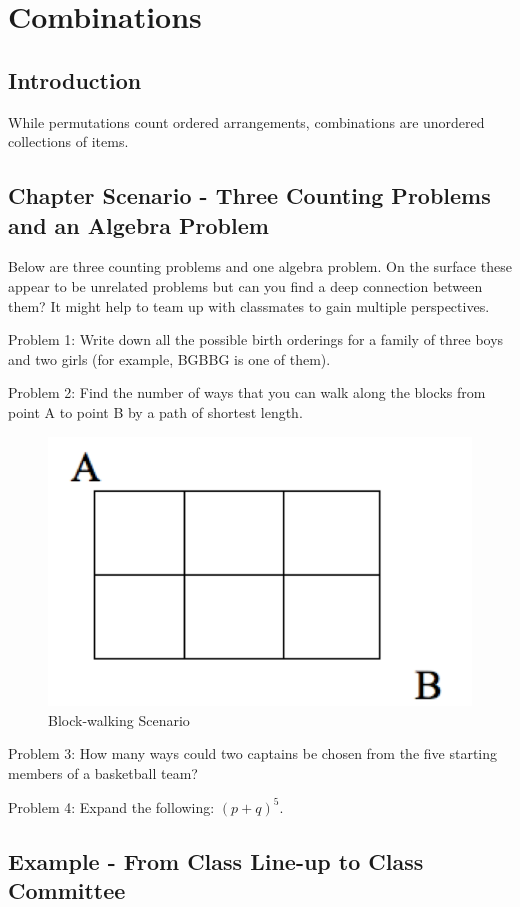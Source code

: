\documentclass[]{book}
\theoremstyle{definition}
\theoremstyle{definition}
\theoremstyle{definition}
\theoremstyle{remark}
\begin{document}
\chapter{Combinations}\label{combinations}

\section{Introduction}\label{introduction}

While permutations count ordered arrangements, combinations are
unordered collections of items.

\section{Chapter Scenario - Three Counting Problems and an Algebra
Problem}\label{chapter_scenario_three_counting_problems}

Below are three counting problems and one algebra problem. On the
surface these appear to be unrelated problems but can you find a deep
connection between them? It might help to team up with classmates to
gain multiple perspectives.

Problem 1: Write down all the possible birth orderings for a family of
three boys and two girls (for example, BGBBG is one of them).

Problem 2: Find the number of ways that you can walk along the blocks
from point A to point B by a path of shortest length.

\begin{figure}

{\centering \includegraphics[width=0.3\linewidth]{01-basics-figures/block_walking_scenario} 

}

\caption{Block-walking Scenario}\label{fig:nice-fig-101}
\end{figure}

Problem 3: How many ways could two captains be chosen from the five
starting members of a basketball team?

Problem 4: Expand the following: \((p + q)^{5}\).

\section{Example - From Class Line-up to Class
Committee}\label{example_class_lineup_to_class_committee}
\end{document}
